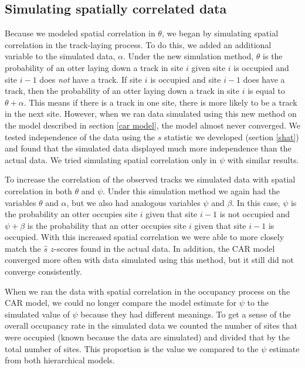 \documentclass[12pt]{article}
\begin{document}
    \subsection{Simulating spatially correlated data}
    Because we modeled spatial correlation in $\theta$, we began by simulating
    spatial correlation in the track-laying process. To do this, we added an
    additional variable to the simulated data, $\alpha$. Under the new
    simulation method, $\theta$ is the probability of an otter laying down a
    track in site $i$ given site $i$ is occupied and site $i-1$ does
    \textit{not} have a track. If site $i$ is occupied and site $i-1$ does have
    a track, then the probability of an otter laying down a track in site $i$ is
    equal to $\theta+\alpha$. This means if there is a track in one site, there
    is more likely to be a track in the next site. However, when we ran data
    simulated using this new method on the model described in section \ref{car
    model}, the model almost never converged. We tested independence of the data
    using the $\hat{s}$ statistic we developed (section \ref{shat}) and found
    that the simulated data displayed much more independence than the actual
    data. We tried simulating spatial correlation only in $\psi$ with similar
    results.

    To increase the correlation of the observed tracks we simulated data with 
    spatial
    correlation in both $\theta$ and $\psi$. Under this simulation method we
    again had the variables $\theta$ and $\alpha$, but we also had analogous
    variables $ \psi$ and $\beta$. In this case, $\psi$ is the probability an
    otter occupies site $i$ given that site $i-1$ is not occupied and $\psi+
    \beta$ is the probability that an otter occupies site $i$ given that site
    $i-1$ is occupied. With this increased spatial correlation we were able to
    more closely match the $\hat{s}$ $z$-scores found in the actual data. In
    addition, the CAR model converged more often with data simulated using this
    method, but it still did not converge consistently.

    When we ran the data with spatial correlation in the occupancy process on
    the CAR model, we could no longer compare the model estimate for $\psi$ to
    the simulated value of $\psi$ because they had different meanings. To get a
    sense of the overall occupancy rate in the simulated data we counted the
    number of sites that were occupied (known because the data are simulated)
    and divided that by the total number of sites. This proportion is the value
    we compared to the $\psi$ estimate from both hierarchical models.
\end{document}

